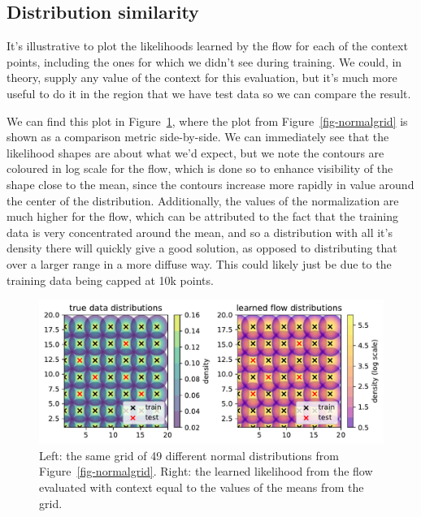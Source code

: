 \documentclass[
  11pt,
  numbers=noendperiod]{book}
\begin{document}
\hypertarget{distribution-similarity}{%
\subsection{Distribution similarity}\label{distribution-similarity}}

It's illustrative to plot the likelihoods learned by the flow for each
of the context points, including the ones for which we didn't see during
training. We could, in theory, supply any value of the context for this
evaluation, but it's much more useful to do it in the region that we
have test data so we can compare the result.

We can find this plot in Figure~\ref{fig-simple-lhoods}, where the plot
from Figure~\ref{fig-normalgrid} is shown as a comparison metric
side-by-side. We can immediately see that the likelihood shapes are
about what we'd expect, but we note the contours are coloured in log
scale for the flow, which is done so to enhance visibility of the shape
close to the mean, since the contours increase more rapidly in value
around the center of the distribution. Additionally, the values of the
normalization are much higher for the flow, which can be attributed to
the fact that the training data is very concentrated around the mean,
and so a distribution with all it's density there will quickly give a
good solution, as opposed to distributing that over a larger range in a
more diffuse way. This could likely just be due to the training data
being capped at 10k points.

\begin{figure}

{\centering \includegraphics{./images/flows/simple/simpleflowvsdata.pdf}

}

\caption{\label{fig-simple-lhoods}Left: the same grid of 49 different
normal distributions from Figure~\ref{fig-normalgrid}. Right: the
learned likelihood from the flow evaluated with context equal to the
values of the means from the grid.}

\end{figure}
\end{document}
